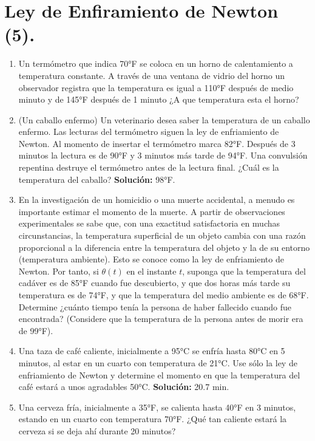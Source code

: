 \documentclass[letterpaper,10pt]{memoir}
\begin{document}
\titulo

\section*{Ley de Enfiramiento de Newton (5).} %
\begin{enumerate}
	\item Un termómetro que indica 70°F se coloca en un horno de calentamiento a temperatura constante. A través de una ventana de vidrio del horno un observador registra que la temperatura es igual a 110°F después de medio minuto y de 145°F después de 1 minuto ¿A que temperatura esta el horno?
	\item (Un caballo enfermo) Un veterinario desea saber la temperatura de un caballo enfermo. Las lecturas del termómetro siguen la ley de enfriamiento de Newton. Al momento de insertar el termómetro marca 82°F. Después de 3 minutos la lectura es de 90°F y 3 minutos más tarde de 94°F. Una convulsión repentina destruye el termómetro antes de la lectura final. ¿Cuál es la temperatura del caballo? \textbf{Solución:} 98°F.
	\item En la investigación de un homicidio o una muerte accidental, a menudo es importante estimar el momento de la muerte. A partir de observaciones experimentales se sabe que, con una exactitud satisfactoria en muchas circunstancias, la temperatura superficial de un objeto cambia con una razón proporcional a la diferencia entre la temperatura del objeto y la de su entorno (temperatura ambiente). Esto se conoce como la ley de enfriamiento de Newton. Por tanto, si \(\theta (t)\) en el instante \(t\), suponga que la temperatura del cadáver es de 85°F cuando fue descubierto, y que dos horas más tarde su temperatura es de 74°F, y que la temperatura del medio ambiente es de 68°F.\\
	Determine ¿cuánto tiempo tenía la persona de haber fallecido cuando fue encontrada? (Considere que la temperatura de la persona antes de morir era de 99°F).
	\item Una taza de café caliente, inicialmente a 95°C se enfría hasta 80°C en 5 minutos, al estar en un cuarto con temperatura de 21°C. Use sólo la ley de enfriamiento de Newton y determine el momento en que la temperatura del café estará a unos agradables 50°C. \textbf{Solución:} 20.7 min.
	\item Una cerveza fría, inicialmente a 35°F, se calienta hasta 40°F en 3 minutos, estando en un cuarto con temperatura 70°F. ¿Qué tan caliente estará la cerveza si se deja ahí durante 20 minutos?

\end{enumerate}
\end{document}
